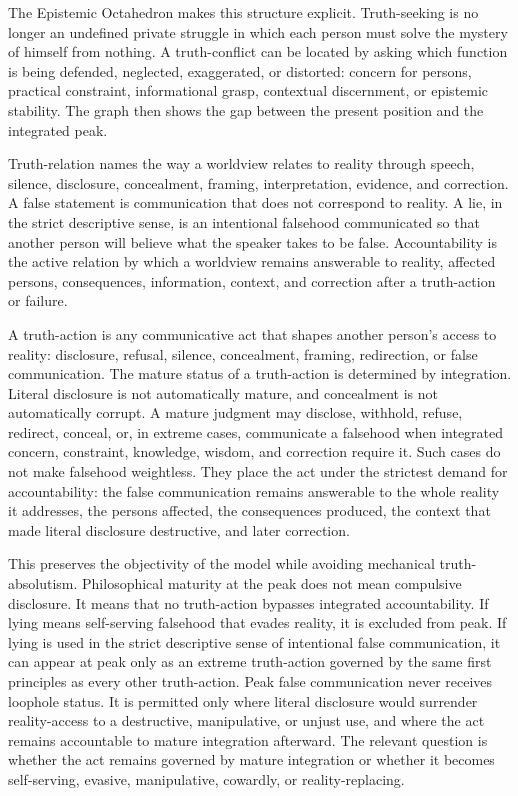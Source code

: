 \documentclass[11pt]{article}
\begin{document}
The Epistemic Octahedron makes this structure explicit. Truth-seeking is no longer an undefined private struggle in which each person must solve the mystery of himself from nothing. A truth-conflict can be located by asking which function is being defended, neglected, exaggerated, or distorted: concern for persons, practical constraint, informational grasp, contextual discernment, or epistemic stability. The graph then shows the gap between the present position and the integrated peak.

Truth-relation names the way a worldview relates to reality through speech, silence, disclosure, concealment, framing, interpretation, evidence, and correction. A false statement is communication that does not correspond to reality. A lie, in the strict descriptive sense, is an intentional falsehood communicated so that another person will believe what the speaker takes to be false. Accountability is the active relation by which a worldview remains answerable to reality, affected persons, consequences, information, context, and correction after a truth-action or failure.

A truth-action is any communicative act that shapes another person's access to reality: disclosure, refusal, silence, concealment, framing, redirection, or false communication. The mature status of a truth-action is determined by integration. Literal disclosure is not automatically mature, and concealment is not automatically corrupt. A mature judgment may disclose, withhold, refuse, redirect, conceal, or, in extreme cases, communicate a falsehood when integrated concern, constraint, knowledge, wisdom, and correction require it. Such cases do not make falsehood weightless. They place the act under the strictest demand for accountability: the false communication remains answerable to the whole reality it addresses, the persons affected, the consequences produced, the context that made literal disclosure destructive, and later correction.

This preserves the objectivity of the model while avoiding mechanical truth-absolutism. Philosophical maturity at the peak does not mean compulsive disclosure. It means that no truth-action bypasses integrated accountability. If lying means self-serving falsehood that evades reality, it is excluded from peak. If lying is used in the strict descriptive sense of intentional false communication, it can appear at peak only as an extreme truth-action governed by the same first principles as every other truth-action. Peak false communication never receives loophole status. It is permitted only where literal disclosure would surrender reality-access to a destructive, manipulative, or unjust use, and where the act remains accountable to mature integration afterward. The relevant question is whether the act remains governed by mature integration or whether it becomes self-serving, evasive, manipulative, cowardly, or reality-replacing.
\end{document}

